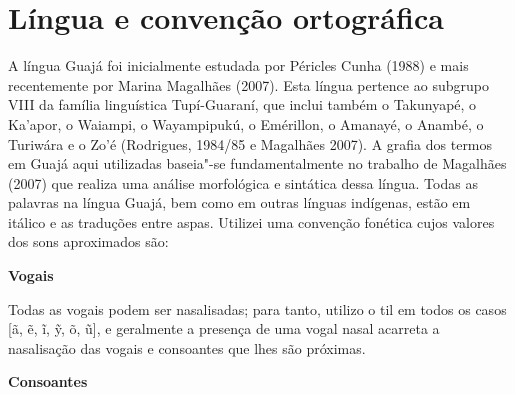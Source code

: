 
\chapter{Língua e convenção
ortográfica}\label{luxedngua-e-convenuxe7uxe3o-ortogruxe1fica}

\noindent A língua Guajá foi inicialmente estudada por Péricles Cunha (1988) e
mais recentemente por Marina Magalhães (2007). Esta língua pertence ao
subgrupo VIII da família linguística Tupí-Guaraní, que inclui também o
Takunyapé, o Ka'apor, o Waiampi, o Wayampipukú, o Emérillon, o Amanayé,
o Anambé, o Turiwára e o Zo'é (Rodrigues, 1984/85 e Magalhães 2007). A
grafia dos termos em Guajá aqui utilizadas baseia"-se fundamentalmente no
trabalho de Magalhães (2007) que realiza uma análise morfológica e
sintática dessa língua. Todas as palavras na língua Guajá, bem como em
outras línguas indígenas, estão em itálico e as traduções entre aspas.
Utilizei uma convenção fonética cujos valores dos sons aproximados são:

\textbf{Vogais}


Todas as vogais podem ser nasalisadas; para tanto, utilizo o til em
todos os casos {[}ã, ẽ, ĩ, ỹ, õ, ũ{]}, e geralmente a presença de uma
vogal nasal acarreta a nasalisação das vogais e consoantes que lhes são
próximas.

\textbf{Consoantes}

